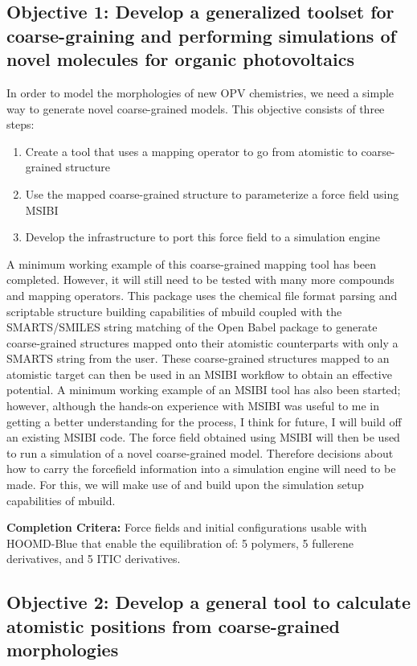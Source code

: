 \subsection*{Objective 1: Develop a generalized toolset for coarse-graining and performing simulations of novel molecules for organic photovoltaics}
In order to model the morphologies of new OPV chemistries, we need a simple way to generate novel coarse-grained models.
This objective consists of three steps:
\begin{enumerate}
    \item {Create a tool that uses a mapping operator to go from atomistic to coarse-grained structure}
    \item {Use the mapped coarse-grained structure to parameterize a force field using MSIBI}
    \item {Develop the infrastructure to port this force field to a simulation engine}
\end{enumerate}
A minimum working example of this coarse-grained mapping tool has been completed\cite{grits}.
However, it will still need to be tested with many more compounds and mapping operators.
This package uses the chemical file format parsing and scriptable structure building capabilities of mbuild coupled with the SMARTS/SMILES string matching of the Open Babel package to generate coarse-grained structures mapped onto their atomistic counterparts with only a SMARTS string from the user.
These coarse-grained structures mapped to an atomistic target can then be used in an MSIBI workflow to obtain an effective potential.
A minimum working example of an MSIBI tool has also been started; however, although the hands-on experience with MSIBI was useful to me in getting a better understanding for the process, I think for future, I will build off an existing MSIBI code\cite{msibi, Moore2014}.
The force field obtained using MSIBI will then be used to run a simulation of a novel coarse-grained model.
Therefore decisions about how to carry the forcefield information into a simulation engine will need to be made.
For this, we will make use of and build upon the simulation setup capabilities of mbuild.

\textbf{Completion Critera:} Force fields and initial configurations usable with HOOMD-Blue that enable the equilibration of: 5 polymers, 5 fullerene derivatives, and 5 ITIC derivatives. 

\subsection*{Objective 2: Develop a general tool to calculate atomistic positions from coarse-grained morphologies}


